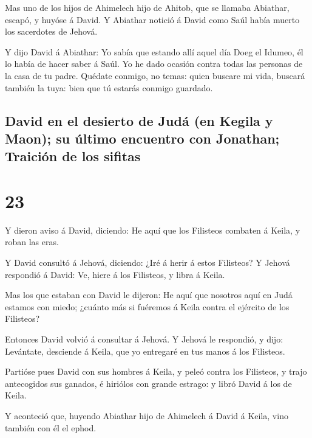  Mas uno de los hijos de Ahimelech hijo de Ahitob, que se
llamaba Abiathar, escapó, y huyóse á David.  Y Abiathar
notició á David como Saúl había muerto los sacerdotes de Jehová.

 Y dijo David á Abiathar: Yo sabía que estando allí aquel
día Doeg el Idumeo, él lo había de hacer saber á Saúl. Yo he dado
ocasión contra todas las personas de la casa de tu padre.
 Quédate conmigo, no temas: quien buscare mi vida,
buscará también la tuya: bien que tú estarás conmigo guardado.

\hypertarget{david-en-el-desierto-de-juduxe1-en-kegila-y-maon-su-uxfaltimo-encuentro-con-jonathan-traiciuxf3n-de-los-sifitas}{%
\subsection{David en el desierto de Judá (en Kegila y Maon); su último
encuentro con Jonathan; Traición de los
sifitas}\label{david-en-el-desierto-de-juduxe1-en-kegila-y-maon-su-uxfaltimo-encuentro-con-jonathan-traiciuxf3n-de-los-sifitas}}

\hypertarget{section-09-23}{%
\section{23}\label{section-09-23}}

 Y dieron aviso á David, diciendo: He aquí que los
Filisteos combaten á Keila, y roban las eras.

 Y David consultó á Jehová, diciendo: ¿Iré á herir á estos
Filisteos? Y Jehová respondió á David: Ve, hiere á los Filisteos, y
libra á Keila.

 Mas los que estaban con David le dijeron: He aquí que
nosotros aquí en Judá estamos con miedo; ¿cuánto más si fuéremos á Keila
contra el ejército de los Filisteos?

 Entonces David volvió á consultar á Jehová. Y Jehová le
respondió, y dijo: Levántate, desciende á Keila, que yo entregaré en tus
manos á los Filisteos.

 Partióse pues David con sus hombres á Keila, y peleó
contra los Filisteos, y trajo antecogidos sus ganados, é hiriólos con
grande estrago: y libró David á los de Keila.

 Y aconteció que, huyendo Abiathar hijo de Ahimelech á
David á Keila, vino también con él el ephod.

